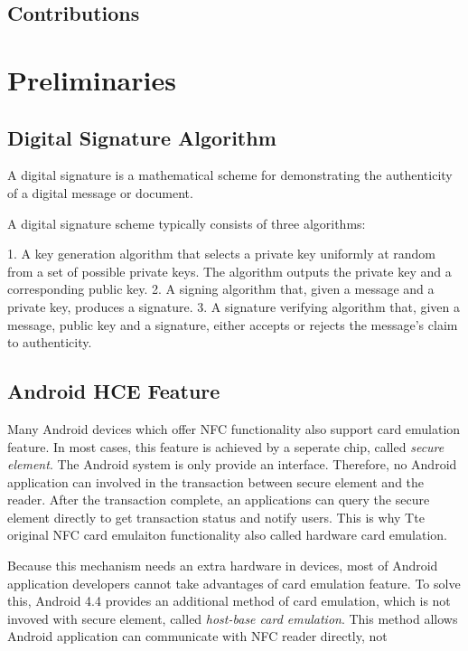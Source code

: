 \begin{CJK}{Bg5}{bsmi}
\section{Contributions}


\chapter{Preliminaries}

\section{Digital Signature Algorithm}

A digital signature is a mathematical scheme for demonstrating the authenticity of a digital message or document. 

A digital signature scheme typically consists of three algorithms:

1. A key generation algorithm that selects a private key uniformly at random from a set of possible private keys. The algorithm outputs the private key and a corresponding public key.
2. A signing algorithm that, given a message and a private key, produces a signature.
3. A signature verifying algorithm that, given a message, public key and a signature, either accepts or rejects the message's claim to authenticity.





\section{Android HCE Feature}

Many Android devices which offer NFC functionality also support card emulation feature. In most cases, this feature is achieved by a seperate chip, called \emph{secure element}. The Android system is only provide an interface. Therefore, no Android application can involved in the transaction between secure element and the reader. After the transaction complete, an applications can query the secure element directly to get transaction status and notify users. This is why Tte original NFC card emulaiton functionality also called hardware card emulation.

Because this mechanism needs an extra hardware in devices, most of Android application developers cannot take advantages of card emulation feature. To solve this, Android 4.4 provides an additional method of card emulation, which is not invoved with secure element, called \emph{host-base card emulation}. This method allows Android application can communicate with NFC reader directly, not 


\end{CJK}
